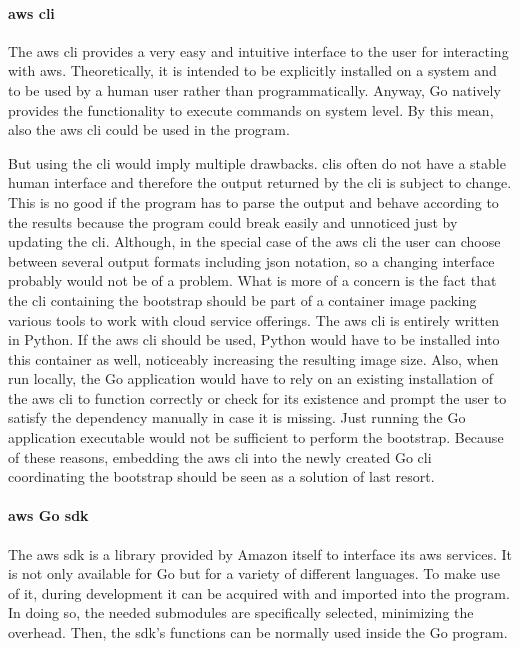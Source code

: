 \paragraph{\ac{aws} \ac{cli}}
The \ac{aws} \ac{cli} provides a very easy and intuitive interface to the user for interacting with \ac{aws}.
Theoretically, it is intended to be explicitly installed on a system and to be used by a human user rather than programmatically.
Anyway, Go natively provides the functionality to execute commands on system level.
By this mean, also the \ac{aws} \ac{cli} could be used in the program.

But using the \ac{cli} would imply multiple drawbacks.
\acp{cli} often do not have a stable human interface and therefore the output returned by the \ac{cli} is subject to change.
This is no good if the program has to parse the output and behave according to the results because the program could break easily and unnoticed just by updating the \ac{cli}.
Although, in the special case of the \ac{aws} \ac{cli} the user can choose between several output formats including \ac{json} notation, so a changing interface probably would not be of a problem.
What is more of a concern is the fact that the \ac{cli} containing the bootstrap should be part of a container image packing various tools to work with cloud service offerings.
The \ac{aws} \ac{cli} is entirely written in Python.
If the \ac{aws} \ac{cli} should be used, Python would have to be installed into this container as well, noticeably increasing the resulting image size.
Also, when run locally, the Go application would have to rely on an existing installation of the \ac{aws} \ac{cli} to function correctly or check for its existence and prompt the user to satisfy the dependency manually in case it is missing.
Just running the Go application executable would not be sufficient to perform the bootstrap.
Because of these reasons, embedding the \ac{aws} \ac{cli} into the newly created Go \ac{cli} coordinating the bootstrap should be seen as a solution of last resort.

\paragraph{\ac{aws} Go \acs*{sdk}}
The \ac{aws} \ac{sdk} is a library provided by Amazon itself to interface its \ac{aws} services.
It is not only available for Go but for a variety of different languages.
To make use of it, during development it can be acquired with  and imported into the program.
In doing so, the needed submodules are specifically selected, minimizing the overhead.
Then, the \ac{sdk}'s functions can be normally used inside the Go program.

